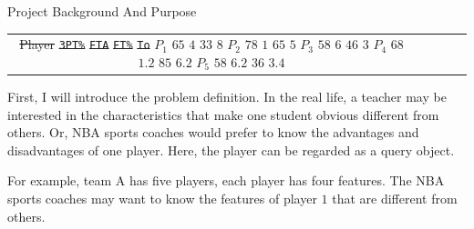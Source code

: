 \documentclass[
 size=14pt,
 paper=smartboard,  %
 mode=present, 		%
 display=slides, 	%
 style=tuliplab,  	%
 pauseslide,
 fleqn,leqno]{powerdot}
\providecommand{\DIFdeltex}[1]{{\protect\color{red}\sout{#1}}}                      %
\providecommand{\DIFaddbegin}{} %
\providecommand{\DIFaddend}{} %
\providecommand{\DIFdelbegin}{} %
\providecommand{\DIFdelend}{} %
\providecommand{\DIFdel}[1]{\texorpdfstring{\DIFdeltex{#1}}{}} %
\newcommand{\DIFscaledelfig}{0.5}
\newlength{\DIFdelgraphicswidth} %
\newlength{\DIFdelgraphicsheight} %
\newcommand{\DIFaddincludegraphics}[2][]{{\color{blue}\fbox{\DIFOincludegraphics[#1]{#2}}}} %
\newcommand{\DIFdelincludegraphics}[2][]{%
\sbox{\DIFdelgraphicsbox}{\DIFOincludegraphics[#1]{#2}}%
\settoboxwidth{\DIFdelgraphicswidth}{\DIFdelgraphicsbox} %
\settoboxtotalheight{\DIFdelgraphicsheight}{\DIFdelgraphicsbox} %
\scalebox{\DIFscaledelfig}{%
\parbox[b]{\DIFdelgraphicswidth}{\usebox{\DIFdelgraphicsbox}\\[-\baselineskip] \rule{\DIFdelgraphicswidth}{0em}}\llap{\resizebox{\DIFdelgraphicswidth}{\DIFdelgraphicsheight}{%
\setlength{\unitlength}{\DIFdelgraphicswidth}%
\begin{picture}(1,1)%
\thicklines\linethickness{2pt} %
{\color[rgb]{1,0,0}\put(0,0){\framebox(1,1){}}}%
{\color[rgb]{1,0,0}\put(0,0){\line( 1,1){1}}}%
{\color[rgb]{1,0,0}\put(0,1){\line(1,-1){1}}}%
\end{picture}%
}\hspace*{3pt}}} %
} %
\DeclareRobustCommand{\DIFaddbegin}{\DIFOaddbegin \let\includegraphics\DIFaddincludegraphics} %
\DeclareRobustCommand{\DIFaddend}{\DIFOaddend \let\includegraphics\DIFOincludegraphics} %
\DeclareRobustCommand{\DIFdelbegin}{\DIFOdelbegin \let\includegraphics\DIFdelincludegraphics} %
\DeclareRobustCommand{\DIFdelend}{\DIFOaddend \let\includegraphics\DIFOincludegraphics} %
\begin{document}
\begin{slide}
\begin{slide}{Project Background And Purpose}
\begin{center}
\end{center}
\bigskip
\begin{center}
\begin{tabular}{c| c c c c }
\toprule
\DIFdelbegin \DIFdel{Player }%
\texttt{\DIFdel{3PT\%}}  %
\texttt{\DIFdel{FTA}} %
\texttt{\DIFdel{FT\%}} %
\texttt{\DIFdel{To}} %
\DIFdelend \midrule
\DIFdelbegin \DIFdel{$P_1$
}%
\DIFdel{$65$}%
\DIFdel{$4$}%
\DIFdel{$33$}%
\DIFdel{$8$}%
\DIFdel{$P_2$
}%
\DIFdel{$78$}%
\DIFdel{$1$}%
\DIFdel{$65$}%
\DIFdel{$5$}%
\DIFdel{$P_3$
}%
\DIFdel{$58$}%
\DIFdel{$6$}%
\DIFdel{$46$}%
\DIFdel{$3$}%
\DIFdel{$P_4$
}%
\DIFdel{$68$}%
\DIFdel{$1.2$}%
\DIFdel{$85$}%
\DIFdel{$6.2$}%
\DIFdel{$P_5$
}%
\DIFdel{$58$}%
\DIFdel{$6.2$}%
\DIFdel{$36$}%
\DIFdel{$3.4$}%
\DIFdelend \DIFaddbegin 

\DIFaddend \bottomrule
\end{tabular}
\end{center}
\bigskip

\begin{note}
First, I will introduce the problem definition.
In the real life,
a teacher may be interested in the characteristics that
make one student obvious different from others.
Or,
NBA sports coaches would prefer to
know the advantages and disadvantages of one player.
Here, the player can be regarded as a query object.

For example, team A has five players,
each player has four features.
The NBA sports coaches may want to know the features of
player $1$ that are different from others.


\end{note}
\end{slide}
\end{slide}
\end{document}
